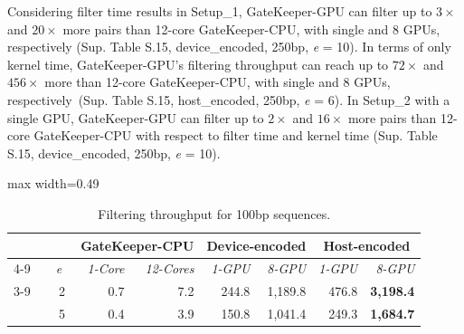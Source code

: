 Considering filter time results in Setup\_1, GateKeeper-GPU can filter up to $3\times$ and $20\times$ more pairs than 12-core GateKeeper-CPU, with single and 8 GPUs, respectively (Sup. Table S.15, device\_encoded, 250bp, \textit{e} = 10). In terms of only kernel time, GateKeeper-GPU's filtering throughput can reach up to $72\times$ and $456\times$ more than 12-core GateKeeper-CPU, with single and 8 GPUs, respectively~(Sup. Table S.15, host\_encoded, 250bp, \textit{e} = 6). In Setup\_2 with a single GPU, GateKeeper-GPU can filter up to $2\times$ and $16\times$ more pairs than 12-core GateKeeper-CPU with respect to filter time and kernel time (Sup. Table S.15, device\_encoded, 250bp, \textit{e} = 10).

\begin{table}[!htbp]
\caption{Filtering throughput for 100bp sequences.}
\label{tab:100bp_filtering_throughput}
\begin{adjustbox}{max width=0.49\textwidth}
\Large
\begin{tabular}{lcc|rr|rr|rr}
                                                        &                                         & \multicolumn{1}{c}{\textbf{} }  & \multicolumn{2}{c}{\textbf{GateKeeper-CPU} }                                    & \multicolumn{2}{c}{\textbf{Device-encoded} }                               & \multicolumn{2}{c}{\textbf{Host-encoded} }                                 \\  
\cline{4-9}   
\multicolumn{1}{c}{}    \rule{0pt}{3ex}                                 &                                         & \multicolumn{1}{c}{\textit{e}~} & \multicolumn{1}{r}{\textit{1-Core } } & \multicolumn{1}{r}{\textit{12-Cores } } & \multicolumn{1}{r}{\textit{1-GPU } } & \multicolumn{1}{r}{\textit{8-GPU} } & \multicolumn{1}{r}{\textit{1-GPU } } & \multicolumn{1}{r}{\textit{8-GPU}}  \\ 
\cline{3-9}
\multirow{4}{*}{Setup\_1}                     &  \rule{0pt}{2ex} \multirow{2}{*}{kt}                     & 2                               & 0.7                                   & 7.2                                     & 244.8                                & 1,189.8                             & 476.8                                & \textbf{3,198.4}                    \\
                                                        &                                         & 5                               & 0.4                                   & 3.9                                     & 150.8                                & 1,041.4                             & 249.3                                & \textbf{1,684.7}                    \\ 

\end{tabular}
\end{adjustbox}
\end{table}
